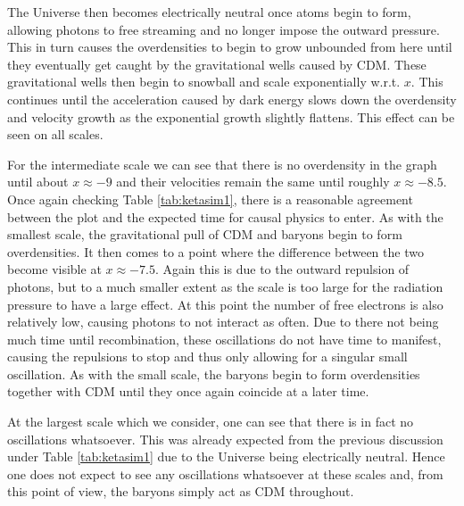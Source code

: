 \documentclass[%
reprint,
 amsmath,amssymb,
 aps,
]{revtex4-2}
\begin{document}
The Universe then becomes electrically neutral once atoms begin to form, allowing photons to free streaming and no longer impose the outward pressure. This in turn causes the overdensities to begin to grow unbounded from here until they eventually get caught by the gravitational wells caused by CDM. These gravitational wells then begin to snowball and scale exponentially w.r.t. $x$. This continues until the acceleration caused by dark energy slows down the overdensity and velocity growth as the exponential growth slightly flattens. This effect can be seen on all scales.

For the intermediate scale we can see that there is no overdensity in the graph until about $x\approx-9$ and their velocities remain the same until roughly $x\approx-8.5$. Once again checking Table \ref{tab:ketasim1}, there is a reasonable agreement between the plot and the expected time for causal physics to enter. As with the smallest scale, the gravitational pull of CDM and baryons begin to form overdensities. It then comes to a point where the difference between the two become visible at $x\approx-7.5$. Again this is due to the outward repulsion of photons, but to a much smaller extent as the scale is too large for the radiation pressure to have a large effect. At this point the number of free electrons is also relatively low, causing photons to not interact as often. Due to there not being much time until recombination, these oscillations do not have time to manifest, causing the repulsions to stop and thus only allowing for a singular small oscillation. As with the small scale, the baryons begin to form overdensities together with CDM until they once again coincide at a later time.

At the largest scale which we consider, one can see that there is in fact no oscillations whatsoever. This was already expected from the previous discussion under Table \ref{tab:ketasim1} due to the Universe being electrically neutral. Hence one does not expect to see any oscillations whatsoever at these scales and, from this point of view, the baryons simply act as CDM throughout.
\end{document}
